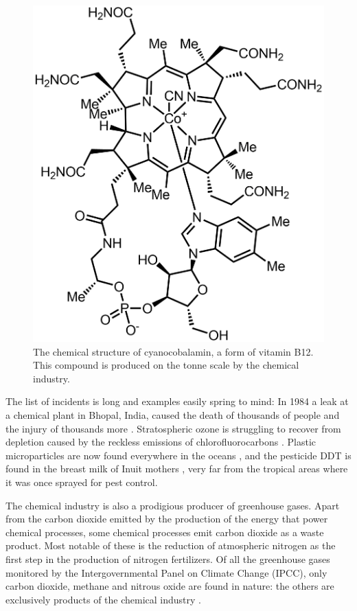 \begin{figure}
\centering
\includegraphics[width=\textwidth]{Figures/Cyanocobalamin-b12.png}
\decoRule

\caption[Cyanocobalamin]{The chemical structure of cyanocobalamin, a form of
vitamin B12. This compound is produced on the tonne scale by the chemical
industry.}

\label{fig:vitb12}

\end{figure}

The list of incidents is long and examples easily spring to mind: In 1984 a leak
at a chemical plant in Bhopal, India, caused the death of thousands of people
and the injury of thousands more \autocite{Varma2005}.
Stratospheric ozone is struggling to recover from depletion caused by the
reckless emissions of chlorofluorocarbons \autocite{Ball2018}. Plastic
microparticles are now found everywhere in the oceans \autocite{Woodall2014},
and the pesticide DDT is found in the breast milk of Inuit mothers
\autocite{Gibson2016}, very far from the tropical areas where it was once
sprayed for pest control.

The chemical industry is also a prodigious producer of greenhouse gases. Apart
from the carbon dioxide emitted by the production of the energy that power
chemical processes, some chemical processes emit carbon dioxide as a waste
product. Most notable of these is the reduction of atmospheric nitrogen as the
first step in the production of nitrogen fertilizers. Of all the greenhouse
gases monitored by the Intergovernmental Panel on Climate Change (IPCC), only
carbon dioxide, methane and nitrous oxide are found in nature: the others are
exclusively products of the chemical industry \autocite{IPCC2014}.

